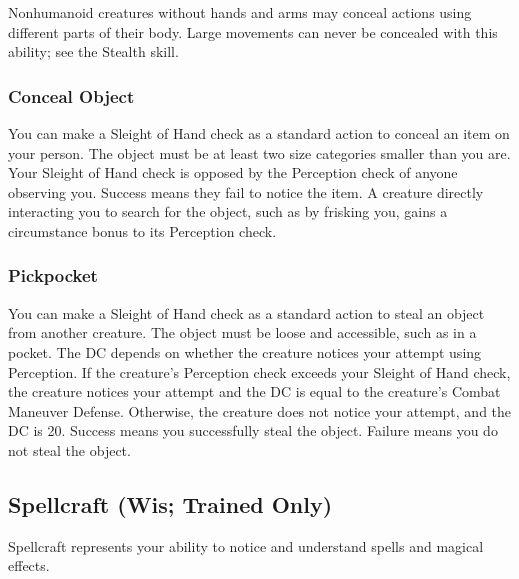 Nonhumanoid creatures without hands and arms may conceal actions using different parts of their body. Large movements can never be concealed with this ability; see the Stealth skill.

\subsubsection{Conceal Object}
You can make a Sleight of Hand check as a standard action to conceal an item on your person. The object must be at least two size categories smaller than you are. Your Sleight of Hand check is opposed by the Perception check of anyone observing you. Success means they fail to notice the item. A creature directly interacting you to search for the object, such as by frisking you, gains a  circumstance bonus to its Perception check.

\subsubsection{Pickpocket}
You can make a Sleight of Hand check as a standard action to steal an object from another creature. The object must be loose and accessible, such as in a pocket. The DC depends on whether the creature notices your attempt using Perception. If the creature's Perception check exceeds your Sleight of Hand check, the creature notices your attempt and the DC is equal to the creature's Combat Maneuver Defense. Otherwise, the creature does not notice your attempt, and the DC is 20. Success means you successfully steal the object. Failure means you do not steal the object.

\subsection{Spellcraft (Wis; Trained Only)}
Spellcraft represents your ability to notice and understand spells and magical effects.

